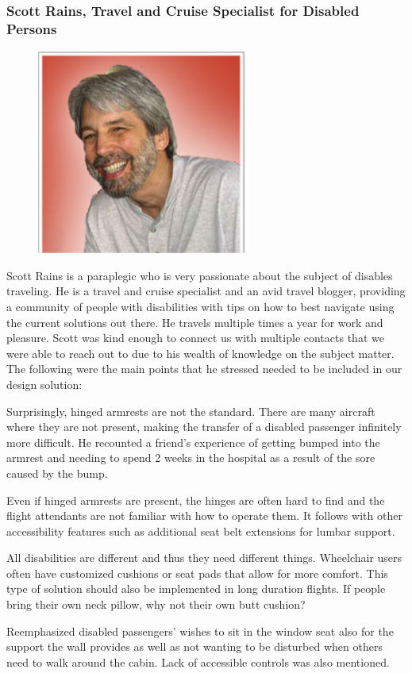 \documentclass[a4paper, 12pt,conference]{new_cit_thesis}
\begin{document}
\subsubsection{Scott Rains, Travel and Cruise Specialist for Disabled Persons}
\begin{figure}[h]
  \centering
     \includegraphics[width=7cm]{images/image024}
  \label{fig:24}
\end{figure}

Scott Rains is a paraplegic who is very passionate about the subject of disables traveling. He is a travel and cruise specialist and an avid travel blogger, providing a community of people with disabilities with tips on how to best navigate using the current solutions out there.  He travels multiple times a year for work and pleasure.  Scott was kind enough to connect us with multiple contacts that we were able to reach out to due to his wealth of knowledge on the subject matter.  The following were the main points that he stressed needed to be included in our design solution: 

\begin{list}{-}{}
  \item Surprisingly, hinged armrests are not the standard. There are many aircraft where they are not present, making the transfer of a disabled passenger infinitely more difficult. He recounted a friend’s experience of getting bumped into the armrest and needing to spend 2 weeks in the hospital as a result of the sore caused by the bump. 
  \item Even if hinged armrests are present, the hinges are often hard to find and the flight attendants are not familiar with how to operate them. It follows with other accessibility features such as additional seat belt extensions for lumbar support.
  \item All disabilities are different and thus they need different things. Wheelchair users often have customized cushions or seat pads that allow for more comfort. This type of solution should also be implemented in long duration flights. If people bring their own neck pillow, why not their own butt cushion?
  \item Reemphasized disabled passengers’ wishes to sit in the window seat also for the support the wall provides as well as not wanting to be disturbed when others need to walk around the cabin. Lack of accessible controls was also mentioned. 
\end{list}
\end{document}
